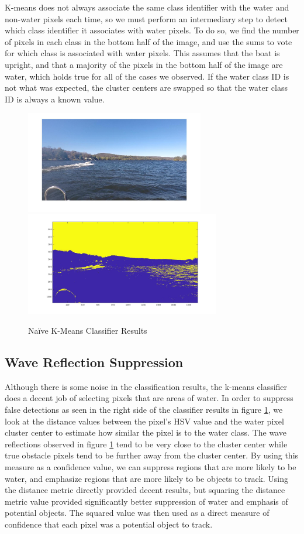 \documentclass{article}
\begin{document}
K-means does not always associate the same class identifier with the water and
non-water pixels each time, so we must perform an intermediary step to detect
which class identifier it associates with water pixels.  To do so, we find the
number of pixels in each class in the bottom half of the image, and use the sums
to vote for which class is associated with water pixels. This assumes that the
boat is upright, and that a majority of the pixels in the bottom half of the
image are water, which holds true for all of the cases we observed.  If the water
class ID is not what was expected, the cluster centers are swapped so that the
water class ID is always a known value.

\begin{figure}[H]
\includegraphics[width=7.8cm]{hsv_kmeans2_orig}
\includegraphics[width=8.5cm]{hsv_kmeans2_result}
\centering
\caption{Na\"ive K-Means Classifier Results}
\label{fig:kmeans}
\end{figure}

\subsection{Wave Reflection Suppression}
Although there is some noise in the classification results, the k-means
classifier does a decent job of selecting pixels that are areas of water. In
order to suppress false detections as seen in the right side of the classifier
results in figure \ref{fig:kmeans}, we look at the distance values between the
pixel's HSV value and the water pixel cluster center to estimate how similar the
pixel is to the water class.  The wave reflections observed in figure
\ref{fig:kmeans} tend to be very close to the cluster center while true obstacle
pixels tend to be further away from the cluster center.  By using this measure
as a confidence value, we can suppress regions that are more likely to be water,
and emphasize regions that are more likely to be objects to track.  Using the
distance metric directly provided decent results, but squaring the distance
metric value provided significantly better suppression of water and emphasis of
potential objects.  The squared value was then used as a direct measure of
confidence that each pixel was a potential object to track.
\end{document}
